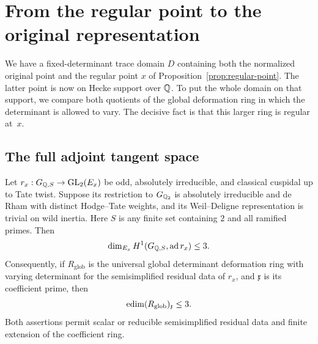 \section{From the regular point to the original representation}
\label{sec:conclusion}

We have a fixed-determinant trace domain $D$ containing both the
normalized original point and the regular point $x$ of
Proposition~\ref{prop:regular-point}.  The latter point is now on
Hecke support over $\mathbb Q$.  To put the whole domain on that support,
we compare both quotients of the global deformation ring in which
the determinant is allowed to vary.  The decisive fact is that this
larger ring is regular at~$x$.

\subsection{The full adjoint tangent space}

\begin{proposition}\label{prop:tangent-bound}
Let $r_x:G_{\mathbb Q,S}\to\operatorname{GL}_2(E_x)$ be odd, absolutely irreducible,
and classical cuspidal up to Tate twist.  Suppose its restriction
to $G_{\mathbb Q_2}$ is absolutely irreducible and de Rham with distinct
Hodge--Tate weights, and its Weil--Deligne representation is trivial
on wild inertia.  Here $S$ is any finite set containing $2$ and all
ramified primes.  Then
\[
 \dim_{E_x}H^1(G_{\mathbb Q,S},\operatorname{ad} r_x)\leq3.
\]
Consequently, if $R_{\mathrm{glob}}$ is the universal global
determinant deformation ring with varying determinant for the
semisimplified residual data of $r_x$, and $\mathfrak x$ is its
coefficient prime, then
\[
 \operatorname{edim} (R_{\mathrm{glob}})_{\mathfrak x}\leq3.
\]
Both assertions permit scalar or reducible semisimplified residual
data and finite extension of the coefficient ring.
\end{proposition}


